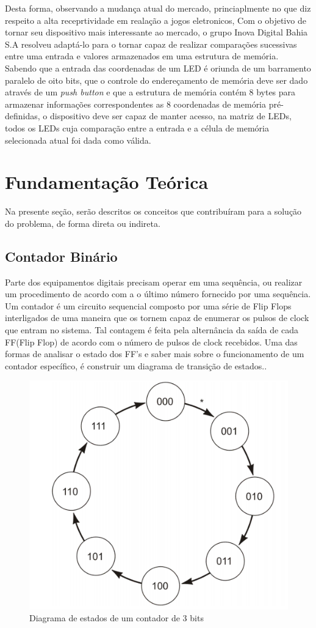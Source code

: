 \documentclass[12pt]{article}
\begin{document}
Desta forma, observando a mudança atual do mercado, princiaplmente no que diz respeito a alta receprtividade em realação a jogos eletronicos, Com o objetivo de tornar seu dispositivo mais interessante ao mercado, o grupo Inova Digital Bahia S.A resolveu adaptá-lo para o tornar capaz de realizar comparações sucessivas entre uma entrada e valores armazenados em uma estrutura de memória. Sabendo que a entrada das coordenadas de um LED é oriunda de um barramento paralelo de oito bits, que o controle do endereçamento de memória deve ser dado através de um \textit{push button} e que a estrutura de memória contém 8 bytes para armazenar informações correspondentes as 8 coordenadas de memória pré-definidas, o dispositivo deve ser capaz de manter acesso, na matriz de LEDs, todos os LEDs cuja comparação entre a entrada e a célula de memória selecionada atual foi dada como válida.

\section{Fundamentação Teórica}

Na presente seção, serão descritos os conceitos que contribuíram para a solução do problema, de forma direta ou indireta.

\subsection{Contador Binário}

Parte dos equipamentos digitais precisam operar em uma sequência, ou realizar um procedimento de acordo com a o último número fornecido por uma sequência. Um contador é um circuito sequencial composto por uma série de Flip Flops interligados de uma maneira que os tornem capaz de enumerar os pulsos de clock que entram no sistema. Tal contagem é feita pela alternância da saída de cada FF(Flip Flop) de acordo com o número de pulsos de clock recebidos. Uma das formas de analisar o estado dos FF's e saber mais sobre o funcionamento de um contador específico, é construir um diagrama de transição de estados.\cite{tocci1997digital}.

\begin{figure}[!htbp]
\centering
\includegraphics[width=.5\textwidth]{img/diagrama-estados.png}
\caption{Diagrama de estados de um contador de 3 bits\cite{tocci1997digital}}
\label{fig:diagrama-estados}
\end{figure}
\end{document}

